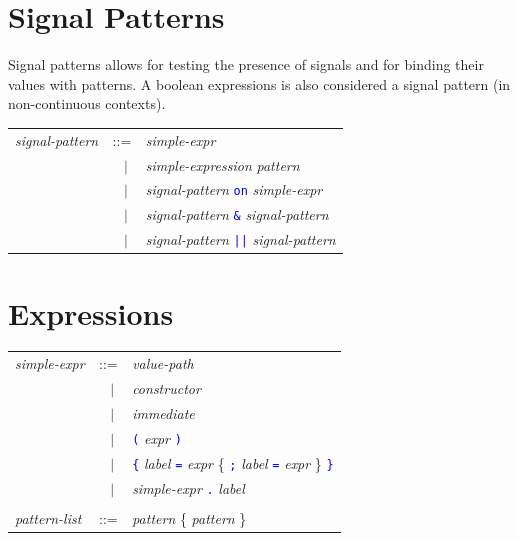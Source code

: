 \documentclass[11pt,titlepage,twoside]{report}
\newcommand{\alt}{\;|\;}
\newcommand{\Minusgreater}{\mbox{{\tt ->}}}
\newcommand{\Equalgreater}{\mbox{{\tt =>}}}
\newcommand{\Marc}[1]{{\bf Marc.} {#1} {\bf Fin}}
\newcommand{\term}[1]{\textcolor{Blue}{\tt #1}}
\newcommand{\nterm}[1]{\textcolor{BrickRed}{\it #1}}
\newcommand{\term}[1]{{\tt #1}}
\newcommand{\nterm}[1]{{\em #1}}
\begin{document}
\section{Signal Patterns\label{sigpatterns}} %


Signal patterns allows for testing the presence of signals and for binding 
their values with patterns.
A boolean expressions is also considered a signal pattern (in non-continuous 
contexts).
\begin{center}
\begin{tabular}{lcl}
\nterm{signal-pattern} 
   & ::=        & \nterm{simple-expr} \\
   & $\;\;\alt$ & \nterm{simple-expression} \nterm{pattern} \\ 
   & $\;\;\alt$ & \nterm{signal-pattern} \term{on} \nterm{simple-expr} \\
   & $\;\;\alt$ & \nterm{signal-pattern} \term{\&} \nterm{signal-pattern} \\
   & $\;\;\alt$ & \nterm{signal-pattern} \term{||} \nterm{signal-pattern}
\end{tabular}
\end{center}

\section{Expressions\label{expressions}} %

\begin{center}
\begin{tabular}{lcl}
\nterm{simple-expr}
  & ::=        & \nterm{value-path} \\
  & $\;\;\alt$ & \nterm{constructor} \\
  & $\;\;\alt$ & \nterm{immediate} \\
  & $\;\;\alt$ & \term{(} \nterm{expr} \term{)} \\
  & $\;\;\alt$ & \term{\{} \nterm{label} \term{=} \nterm{expr}
                 \{ \term{;} \nterm{label} \term{=} \nterm{expr} \} 
                 \term{\}} \\
  & $\;\;\alt$ & \nterm{simple-expr} \term{.} \nterm{label}
\\ \\
\nterm{pattern-list}           
   & ::=        & \nterm{pattern} \{ \nterm{pattern} \}
\end{tabular}
\end{center}
\end{document}
